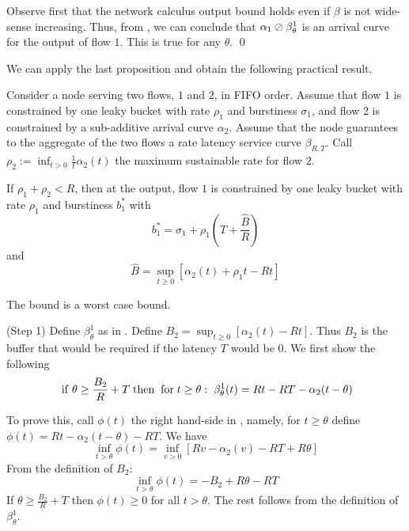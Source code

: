 \pr
Observe first that the network calculus output bound holds even if
$\beta$ is not wide-sense increasing. Thus, from
, we can conclude that
 $\alpha_1 \oslash \beta^1_{\theta}$
 is an arrival curve for the output of flow $1$. This is true for
 any $\theta$.
 \qed

We can apply the last proposition and obtain the following
practical result.

\begin{theorem}
Consider a node serving two flows, $1$ and $2$, in FIFO order.
Assume that flow $1$ is constrained by one leaky bucket with rate
$\rho_1$ and burstiness $\sigma_1$, and flow 2 is constrained by a
sub-additive arrival curve $\alpha_2$. Assume that the node
guarantees to the aggregate of the two flows a rate latency
service curve $\beta_{R,T}$. Call $\rho_2:=\inf_{t>0}
\frac{1}{t}\alpha_2(t)$ the maximum sustainable rate for flow $2$.

If $\rho_1 + \rho_2 < R$, then at the output, flow $1$ is
constrained by one leaky bucket with rate $\rho_1$ and burstiness
$b^*_1$ with
$$
b^*_1= \sigma_1 +\rho_1 \left(T+\frac{\hat{B}}{R}\right)
$$
and
$$
 \hat{B}= \sup_{t \geq 0} \left[
  \alpha_2(t) +\rho_1 t - R t
 \right]
$$

The bound is a worst case bound. 
\end{theorem}

\pr
(Step 1) Define $\beta^1_{\theta}$ as in .
Define $B_2=\sup_{t \geq 0} \left[\alpha_2(t)-R t\right]$. Thus
$B_2$ is the buffer that would be required if the latency $T$
would be $0$. We first show the following
\begin{equation}\mylabel{eq-fifomux37}
\mif \theta \geq \frac{B_2}{R}+T \mthen \mfor t \geq \theta: \;
\beta^1_{\theta}(t)
=
Rt-RT - \alpha_2(t-\theta)
\end{equation}

To prove this, call $\phi(t)$ the right hand-side in
, namely, for $t \geq \theta$ define
$\phi(t)=Rt-\alpha_2(t- \theta)-RT$. We have
$$\inf_{t > \theta} \phi(t)=  \inf_{v > 0} \left[Rv -\alpha_2(v)
-RT + R\theta
 \right]$$
 From the definition of $B_2$:
$$\inf_{t > \theta} \phi(t) = -B_2 + R \theta -RT $$
If $\theta \geq \frac{B_2}{R}+T$ then  $ \phi(t) \geq 0$ for all
$t> \theta$. The rest follows from the definition of
$\beta^1_{\theta}$.


